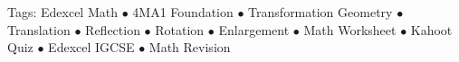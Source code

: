 \documentclass[11pt,a4paper]{article}
\begin{document}
\vspace{14pt}
\begin{center}
  \sffamily\scriptsize\textcolor{textmuted}{
    Tags: Edexcel Math $\bullet$ 4MA1 Foundation $\bullet$ Transformation Geometry $\bullet$ Translation $\bullet$ Reflection $\bullet$ Rotation $\bullet$ Enlargement $\bullet$ Math Worksheet $\bullet$ Kahoot Quiz $\bullet$ Edexcel IGCSE $\bullet$ Math Revision
  }
\end{center}
\end{document}
